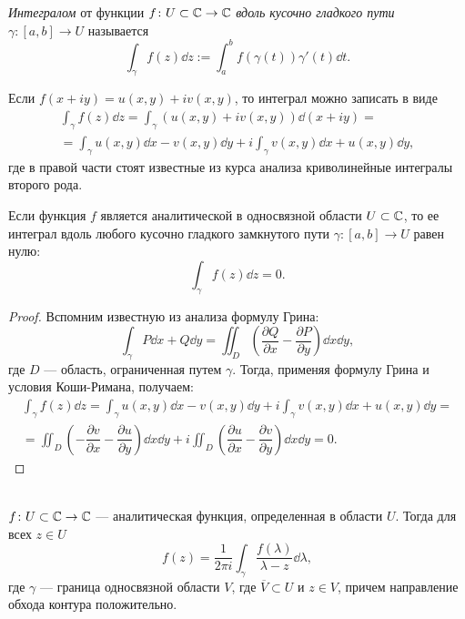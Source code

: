 \begin{definition}
    \emph{Интегралом} от функции $f \colon U \subset \mathbb{C} \to \mathbb{C}$ \emph{вдоль
        кусочно гладкого пути} $\gamma \colon [a, b] \to U$ называется 
    \[ \int_\gamma f(z) \dd z := \int_a^b f(\gamma(t)) \gamma'(t) \dd t. \]
\end{definition}

Если $f(x + i y) = u(x, y) + i v(x, y)$, то интеграл можно записать в виде
\begin{multline*}
 \int_\gamma f(z) \dd z = \int_\gamma (u(x, y) + i v(x, y)) \dd (x + i y) =\\ = 
   \int_\gamma u(x, y) \dd x - v(x, y) \dd y + i \int_\gamma v(x, y) \dd x + u(x, y) \dd y, 
\end{multline*}
где в правой части стоят известные из курса анализа криволинейные интегралы второго рода.

\begin{theorem}[Коши]
    Если функция $f$ является аналитической в односвязной области $U \subset \mathbb{C}$,
    то ее интеграл вдоль любого кусочно гладкого замкнутого 
    пути $\gamma \colon [a, b] \to U$ равен нулю:
    \[ \int_{\gamma} f(z) \dd z = 0. \]
\end{theorem}

\begin{proof}
    Вспомним известную из анализа формулу Грина:
    \[ \int_\gamma P \dd x + Q \dd y = \iint_D \left(\dfrac{\partial Q}{\partial x} - \dfrac{\partial P}{\partial y}\right) \dd x \dd y, \]
    где $D$ --- область, ограниченная путем $\gamma$.
    Тогда, применяя формулу Грина и условия Коши-Римана, получаем:
    \begin{multline*}
     \int_\gamma f(z) \dd z =  
       \int_\gamma u(x, y) \dd x - v(x, y) \dd y + i \int_\gamma v(x, y) \dd x + u(x, y) \dd y = \\ = \iint_D \left(-\dfrac{\partial v}{\partial x} - \dfrac{\partial u}{\partial y}\right) \dd x \dd y + i \iint_D \left(\dfrac{\partial u}{\partial x} - \dfrac{\partial v}{\partial y}\right) \dd x \dd y = 0.
    \end{multline*}
\end{proof}

\begin{theorem}\label{th:cauchy_formula}\hfill\\
     $f \colon U \subset \mathbb{C} \to \mathbb{C}$ --- аналитическая функция, определенная
    в области $U$. Тогда для всех $z \in U$
    \[ f(z) = \frac{1}{2 \pi i} \int_\gamma \frac{f(\lambda)}{\lambda - z} \dd \lambda, \]
    где $\gamma$ --- граница односвязной области $V$, где $\overline V \subset U$ и $z \in V$, 
    причем направление обхода контура положительно.
\end{theorem}

